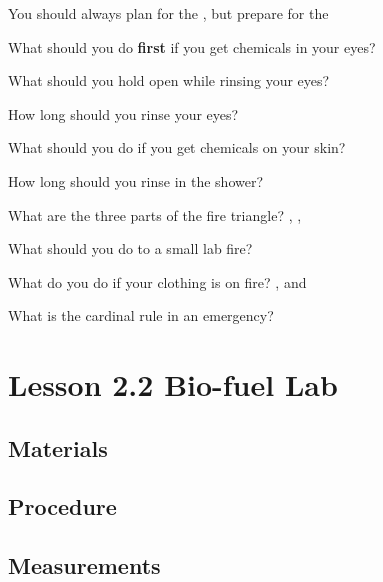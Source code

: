 \documentclass[answers,12pt]{exam}
\begin{document}
\begin{questions}
    \question You should always plan for the \fillin[best], but prepare for the \fillin[worst]

    \question What should you do \textbf{first} if you get chemicals in your eyes? 

    \question What should you hold open while rinsing your eyes? 
    
    \question How long should you rinse your eyes? \fillin[15 - 20 minutes]

    \question What should you do if you get chemicals on your skin? 

    \question How long should you rinse in the shower? \fillin[15 minutes]

    \question What are the three parts of the fire triangle? \fillin[fuel], \fillin[oxygen], \fillin[heat]

    \question What should you do to a small lab fire? \fillin[smother it]

    \question What do you do if your clothing is on fire? \fillin[stop], \fillin[drop] and \fillin[roll]

    \question What is the cardinal rule in an emergency?

    \vspace{2cm}

\end{questions}

\newpage

\section*{Lesson 2.2 Bio-fuel Lab}

\subsection*{Materials}

\vspace{3cm}

\subsection*{Procedure}

\vspace{3cm}

\subsection*{Measurements}
\end{document}
